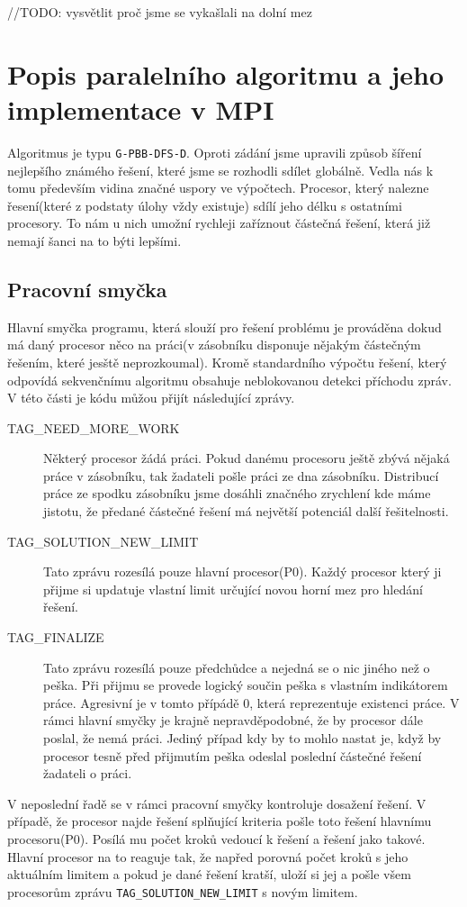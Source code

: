 \documentclass[12pt]{article}
\begin{document}
//TODO: vysvětlit proč jsme se vykašlali na dolní mez

\section{Popis paralelního algoritmu a jeho implementace v MPI}
Algoritmus je typu \verb|G-PBB-DFS-D|. Oproti zádání jsme upravili způsob
šíření nejlepšího známého řešení, které jsme se rozhodli sdílet globálně. Vedla
nás k tomu především vidina značné uspory ve výpočtech. Procesor, který nalezne
řesení(které z podstaty úlohy vždy existuje) sdílí jeho délku s ostatními
procesory. To nám u nich umožní rychleji zaříznout částečná řešení, která již
nemají šanci na to býti lepšími.

\subsection{Pracovní smyčka}
Hlavní smyčka programu, která slouží pro řešení problému je prováděna dokud má
daný procesor něco na práci(v zásobníku disponuje nějakým částečným řešením,
které jesště neprozkoumal). Kromě standardního výpočtu řešení, který odpovídá
sekvenčnímu algoritmu obsahuje neblokovanou detekci příchodu zpráv. V této
části je kódu můžou přijít následující zprávy.

\begin{description}
  \item [TAG\_NEED\_MORE\_WORK] Některý procesor žádá práci. Pokud danému 
procesoru ještě zbývá nějaká práce v zásobníku, tak žadateli pošle práci ze 
dna zásobníku. Distribucí práce ze spodku zásobníku jsme dosáhli značného 
zrychlení kde máme jistotu, že předané částečné řešení má největší potenciál 
další řešitelnosti.
  \item [TAG\_SOLUTION\_NEW\_LIMIT] Tato zprávu rozesílá pouze hlavní
procesor(P0). Každý procesor který ji přijme si updatuje vlastní limit určující
novou horní mez pro hledání řešení. 
  \item [TAG\_FINALIZE] Tato zprávu rozesílá pouze předchůdce a nejedná
se o nic jiného než o peška. Při přijmu se provede logický součin peška s
vlastním indikátorem práce. Agresivní je v tomto přípádě 0, která reprezentuje
existenci práce. V rámci hlavní smyčky je krajně nepravděpodobné, že by procesor
dále poslal, že nemá práci. Jediný případ kdy by to mohlo nastat je, když by
procesor tesně před přijmutím peška odeslal poslední částečné řešení žadateli o
práci.
\end{description}
V neposlední řadě se v rámci pracovní smyčky kontroluje dosažení řešení. V
případě, že procesor najde řešení splňující kriteria pošle toto řešení hlavnímu
procesoru(P0). Posílá mu počet kroků vedoucí k řešení a řešení jako takové.
Hlavní procesor na to reaguje tak, že napřed porovná počet kroků s jeho
aktuálním limitem a pokud je dané řešení kratší, uloží si jej a pošle všem
procesorům zprávu \verb|TAG_SOLUTION_NEW_LIMIT| s novým limitem.
\end{document}
